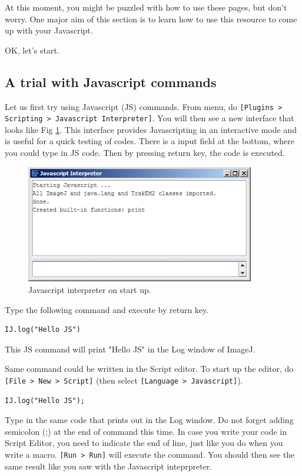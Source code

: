 \documentclass[11pt,a4paper,oneside]{report}
\newcommand{\ijmenu}[1]{\texttt{\small#1}}
\begin{document}
At this moment, you might be puzzled with how to use these pages, but don't worry. One major aim of this section is to learn how to use this resource to come up with your Javascript. 

OK, let's start. 

\subsection{A trial with Javascript commands}
%
Let us first try using Javascript (JS) commands. From menu, do \ijmenu{[Plugins > Scripting > Javascript Interpreter]}. You will then see a new interface that looks like Fig \ref{fig:JSinterpreter}. This interface provides Javascripting in an interactive mode and is useful for a quick testing of codes. There is a input field at the bottom, where you could type in JS code. Then by pressing return key, the code is executed.  

\begin{figure}[htbp]
\begin{center}
\includegraphics[width=100mm]{fig2/JSinterpreterStasrtUp.png}
\caption{Javascript interpreter on start up.}
\label{fig:JSinterpreter}
\end{center}
\end{figure} 

Type the following command and execute by return key. 
\begin{lstlisting}[numbers=none]
IJ.log("Hello JS")
\end{lstlisting}
This JS command will print "Hello JS" in the Log window of ImageJ.  

Same command could be written in the Script editor. To start up the editor, do \ijmenu{[File > New > Script]} (then select \ijmenu{[Language > Javascript]}). 
\begin{lstlisting}[numbers=none]
IJ.log("Hello JS");
\end{lstlisting}
Type in the same code that prints out in the Log window. Do not forget adding semicolon (;) at the end of command this time. In case you write your code in Script Editor, you need to indicate the end of line, just like you do when you write a macro. \ijmenu{[Run > Run]} will execute the command. You should then see the same result like you saw with the Javascript inteprpreter. 
\end{document}
